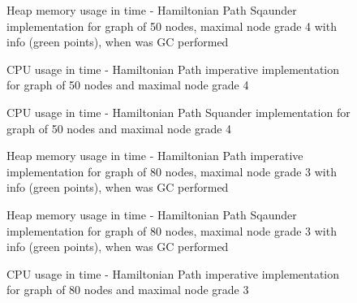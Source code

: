 \documentclass[11pt,twoside,a4paper]{book}
\begin{document}
\begin{figure}[ht]
\begin{center}

\caption{Heap memory usage in time - Hamiltonian Path Sqaunder implementation for
graph of 50 nodes, maximal node grade 4 with info (green points),
when was GC performed}
\label{fig:hpSMem504}
\end{center}
\end{figure}

\begin{figure}[ht]
\begin{center}

\caption{CPU usage in time - Hamiltonian Path imperative implementation for graph
of 50 nodes and maximal node grade 4}
\label{fig:hpICpu504}
\end{center}
\end{figure}


\begin{figure}[ht]
\begin{center}

\caption{CPU usage in time - Hamiltonian Path Squander implementation for graph
of 50 nodes and maximal node grade 4}
\label{fig:hpSCpu504}
\end{center}
\end{figure}


\begin{figure}[ht]
\begin{center}

\caption{Heap memory usage in time - Hamiltonian Path imperative implementation for
graph of 80 nodes, maximal node grade 3 with info (green points),
when was GC performed}
\label{fig:hpIMem803}
\end{center}
\end{figure}




\begin{figure}[ht]
\begin{center}

\caption{Heap memory usage in time - Hamiltonian Path Sqaunder implementation for
graph of 80 nodes, maximal node grade 3 with info (green points),
when was GC performed}
\label{fig:hpSMem803}
\end{center}
\end{figure}


\begin{figure}[ht]
\begin{center}

\caption{CPU usage in time - Hamiltonian Path imperative implementation for graph
of 80 nodes and maximal node grade 3}
\label{fig:hpICpu803}
\end{center}
\end{figure}
\end{document}
